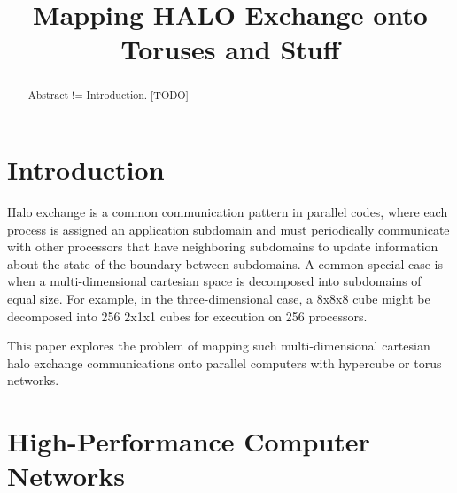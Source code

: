 \documentclass[conference,10pt]{IEEEtran}
\begin{document}
\setlength{\pdfpageheight}{\paperheight}
\setlength{\pdfpagewidth}{\paperwidth}


\title{Mapping HALO Exchange onto Toruses and Stuff}

\author{
}

\maketitle


\begin{abstract}
Abstract != Introduction.
[TODO]
\end{abstract}

\section{Introduction}

Halo exchange is a common communication pattern in parallel codes, where
each process is assigned an application subdomain and must periodically
communicate with other processors that have neighboring subdomains to
update information about the state of the boundary between subdomains.
A common special case is when a multi-dimensional cartesian space is
decomposed into subdomains of equal size.  For example, in the three-dimensional
case, a 8x8x8 cube might be decomposed into 256 2x1x1 cubes for execution on 256 processors.

This paper explores the problem of mapping such multi-dimensional cartesian
halo exchange communications onto parallel computers with hypercube or
torus networks.




\section{High-Performance Computer Networks}
\end{document}
